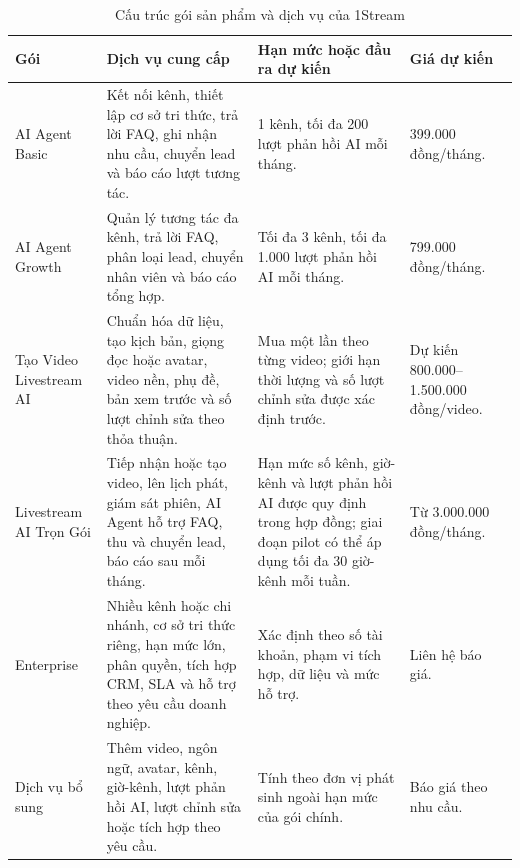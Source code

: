 \begin{table}[H]
    \centering
    \footnotesize
    \setlength{\tabcolsep}{4pt}
    \renewcommand{\arraystretch}{1.3}
    \caption{Cấu trúc gói sản phẩm và dịch vụ của 1Stream}
    \label{tab:goi-dich-vu-1stream}
    \begin{tabularx}{\linewidth}
        {@{}L{2.6cm}Y L{3.2cm}L{2.7cm}@{}}
        \toprule
        \textbf{Gói} &
        \textbf{Dịch vụ cung cấp} &
        \textbf{Hạn mức hoặc đầu ra dự kiến} &
        \textbf{Giá dự kiến} \\ \midrule

        AI Agent Basic &
        Kết nối kênh, thiết lập cơ sở tri thức, trả lời FAQ, ghi nhận nhu cầu,
        chuyển lead và báo cáo lượt tương tác. &
        1 kênh, tối đa 200 lượt phản hồi AI mỗi tháng. &
        399.000 đồng/tháng. \\

        AI Agent Growth &
        Quản lý tương tác đa kênh, trả lời FAQ, phân loại lead, chuyển nhân viên
        và báo cáo tổng hợp. &
        Tối đa 3 kênh, tối đa 1.000 lượt phản hồi AI mỗi tháng. &
        799.000 đồng/tháng. \\

        Tạo Video Livestream AI &
        Chuẩn hóa dữ liệu, tạo kịch bản, giọng đọc hoặc avatar, video nền, phụ
        đề, bản xem trước và số lượt chỉnh sửa theo thỏa thuận. &
        Mua một lần theo từng video; giới hạn thời lượng và số lượt chỉnh sửa
        được xác định trước. &
        Dự kiến 800.000--1.500.000 đồng/video. \\

        Livestream AI Trọn Gói &
        Tiếp nhận hoặc tạo video, lên lịch phát, giám sát phiên, AI Agent hỗ trợ
        FAQ, thu và chuyển lead, báo cáo sau mỗi tháng. &
        Hạn mức số kênh, giờ-kênh và lượt phản hồi AI được quy định trong hợp
        đồng; giai đoạn pilot có thể áp dụng tối đa 30 giờ-kênh mỗi tuần. &
        Từ 3.000.000 đồng/tháng. \\

        Enterprise &
        Nhiều kênh hoặc chi nhánh, cơ sở tri thức riêng, hạn mức lớn, phân quyền,
        tích hợp CRM, SLA và hỗ trợ theo yêu cầu doanh nghiệp. &
        Xác định theo số tài khoản, phạm vi tích hợp, dữ liệu và mức hỗ trợ. &
        Liên hệ báo giá. \\

        Dịch vụ bổ sung &
        Thêm video, ngôn ngữ, avatar, kênh, giờ-kênh, lượt phản hồi AI, lượt
        chỉnh sửa hoặc tích hợp theo yêu cầu. &
        Tính theo đơn vị phát sinh ngoài hạn mức của gói chính. &
        Báo giá theo nhu cầu. \\
        \bottomrule
    \end{tabularx}
\end{table}

